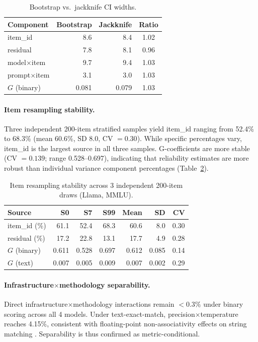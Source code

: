 \documentclass[letterpaper]{article}
\begin{document}
\begin{table}[t]
\centering
\caption{Bootstrap vs.\ jackknife CI widths.}
\label{tab:bj}
\small
\begin{tabular}{lrrc}
\toprule
Component & Bootstrap & Jackknife & Ratio \\
\midrule
item\_id & 8.6 & 8.4 & 1.02 \\
residual & 7.8 & 8.1 & 0.96 \\
model$\times$item & 9.7 & 9.4 & 1.03 \\
prompt$\times$item & 3.1 & 3.0 & 1.03 \\
$G$ (binary) & 0.081 & 0.079 & 1.03 \\
\bottomrule
\end{tabular}
\end{table}

\paragraph{Item resampling stability.}
Three independent 200-item stratified samples yield item\_id ranging from 52.4\% to 68.3\% (mean 60.6\%, SD 8.0, CV $= 0.30$). While specific percentages vary, item\_id is the largest source in all three samples. G-coefficients are more stable (CV $= 0.139$; range 0.528--0.697), indicating that reliability estimates are more robust than individual variance component percentages (Table~\ref{tab:resample}).

\begin{table}[t]
\centering
\caption{Item resampling stability across 3 independent 200-item draws (Llama, MMLU).}
\label{tab:resample}
\small
\begin{tabular}{lrrrrrr}
\toprule
Source & S0 & S7 & S99 & Mean & SD & CV \\
\midrule
item\_id (\%) & 61.1 & 52.4 & 68.3 & 60.6 & 8.0 & 0.30 \\
residual (\%) & 17.2 & 22.8 & 13.1 & 17.7 & 4.9 & 0.28 \\
$G$ (binary) & 0.611 & 0.528 & 0.697 & 0.612 & 0.085 & 0.14 \\
$G$ (text) & 0.007 & 0.005 & 0.009 & 0.007 & 0.002 & 0.29 \\
\bottomrule
\end{tabular}
\end{table}

\paragraph{Infrastructure$\times$methodology separability.}
Direct infrastructure$\times$methodology interactions remain $< 0.3\%$ under binary scoring across all 4 models. Under text-exact-match, precision$\times$temperature reaches 4.15\%, consistent with floating-point non-associativity effects on string matching \citep{messina2026precision}. Separability is thus confirmed as metric-conditional.
\end{document}
